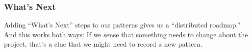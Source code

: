 \subsubsection*{What's Next} 
Adding ``What's Next'' steps to our patterns gives us a ``distributed
roadmap.''  And this works both ways: If we sense that something needs
to change about the project, that's a clue that we might need to
record a new pattern.
